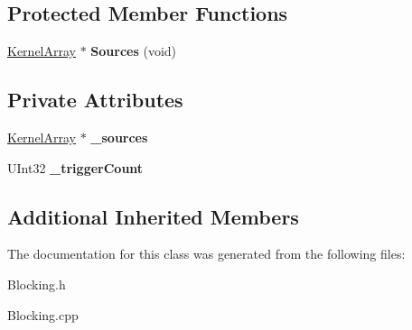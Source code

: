 \subsection*{Protected Member Functions}
\begin{DoxyCompactItemize}
\item 
\mbox{\label{class_list_signal_watcher_aefe7a0f45dfa1f390116d5e1b28376e8}} 
\hyperlink{class_kernel_array}{Kernel\+Array} $\ast$ {\bfseries Sources} (void)
\end{DoxyCompactItemize}
\subsection*{Private Attributes}
\begin{DoxyCompactItemize}
\item 
\mbox{\label{class_list_signal_watcher_adf775720154bb3f077d6924139272ce5}} 
\hyperlink{class_kernel_array}{Kernel\+Array} $\ast$ {\bfseries \+\_\+sources}
\item 
\mbox{\label{class_list_signal_watcher_a2e57c31c92dd9c9aad85b858350b8f69}} 
U\+Int32 {\bfseries \+\_\+trigger\+Count}
\end{DoxyCompactItemize}
\subsection*{Additional Inherited Members}


The documentation for this class was generated from the following files\+:\begin{DoxyCompactItemize}
\item 
Blocking.\+h\item 
Blocking.\+cpp\end{DoxyCompactItemize}
